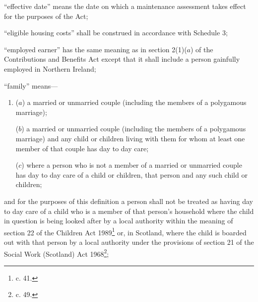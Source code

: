 \documentclass[12pt,a4paper]{article}
\begin{document}
\begin{enumerate}
“effective date” means the date on which a maintenance assessment takes effect for the purposes of the Act;

“eligible housing costs” shall be construed in accordance with Schedule 3;

“employed earner” has the same meaning as in section 2(1)($a$) of the Contributions and Benefits Act
except that it shall include a person gainfully employed in Northern Ireland;  %

%

“family” means—
\begin{enumerate}\item[]
($a$) a married or unmarried couple (including the members of a polygamous marriage);

($b$) a married or unmarried couple (including the members of a polygamous marriage) and any child or children living with them for whom at least one member of that couple has day to day care;

($c$) where a person who is not a member of a married or unmarried couple has day to day care of a child or children, that person and any such child or children;
\end{enumerate}
and for the purposes of this definition a person shall not be treated as having day to day care of a child who is a member of that person’s household where the child in question is being looked after by a local authority within the meaning of section 22 of the Children Act 1989\footnote{ c. 41.} or, in Scotland, where the child is boarded out with that person by a local authority under the provisions of section 21 of the Social Work (Scotland) Act 1968\footnote{ c. 49.};


\end{enumerate}
\end{document}
